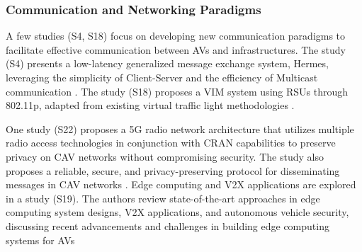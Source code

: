\documentclass[a4paper,12pt]{article}
\begin{document}
\newpage
\subsubsection{Communication and Networking Paradigms}
\hspace{5mm} A few studies (S4, S18) focus on developing new communication paradigms to facilitate effective communication between AVs and infrastructures. The study (S4) presents a low-latency generalized message exchange system, Hermes, leveraging the simplicity of Client-Server and the efficiency of Multicast communication \cite{s4}. The study (S18) proposes a VIM system using RSUs through 802.11p, adapted from existing virtual traffic light methodologies \cite{s18}.\par
One study (S22) proposes a 5G radio network architecture that utilizes multiple radio access technologies in conjunction with CRAN capabilities to preserve privacy on CAV networks without compromising security. The study also proposes a reliable, secure, and privacy-preserving protocol for disseminating messages in CAV networks \cite{s22}. Edge computing and V2X applications are explored in a study (S19). The authors review state-of-the-art approaches in edge computing system designs, V2X applications, and autonomous vehicle security, discussing recent advancements and challenges in building edge computing systems for AVs \cite{s19}
\end{document}

